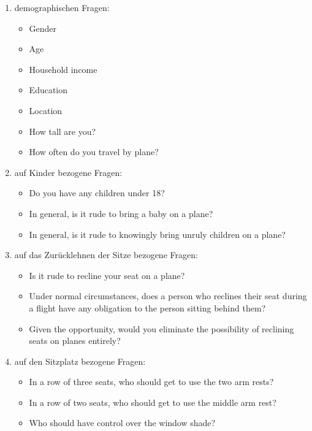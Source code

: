 \documentclass{scrartcl}
\begin{document}
\begin{enumerate}

\item demographischen Fragen:
\begin{itemize}
\item Gender
\item Age
\item Household income
\item Education 
\item Location
\item How tall are you? 
\item How often do you travel by plane? 
\newline \newline
\end{itemize}


\item auf Kinder bezogene Fragen:
\begin{itemize}
\item Do you have any children under 18?
\item In general, is it rude to bring a baby on a plane?
\item In general, is it rude to knowingly bring unruly children on a plane? 
\newline \newline
\end{itemize}


\item auf das Zurücklehnen der Sitze bezogene Fragen: 
\begin{itemize}
\item Is it rude to recline your seat on a plane? 
\item Under normal circumstances, does a person who reclines their seat during a flight have any obligation to the person sitting behind them? 
\item Given the opportunity, would you eliminate the possibility of reclining seats on planes entirely?
\newline \newline
\end{itemize}


\item auf den Sitzplatz bezogene Fragen: 
\begin{itemize}
\item In a row of three seats, who should get to use the two arm rests? 
\item In a row of two seats, who should get to use the middle arm rest?
\item Who should have control over the window shade?
\newline \newline
\end{itemize}



\end{enumerate}
\end{document}
